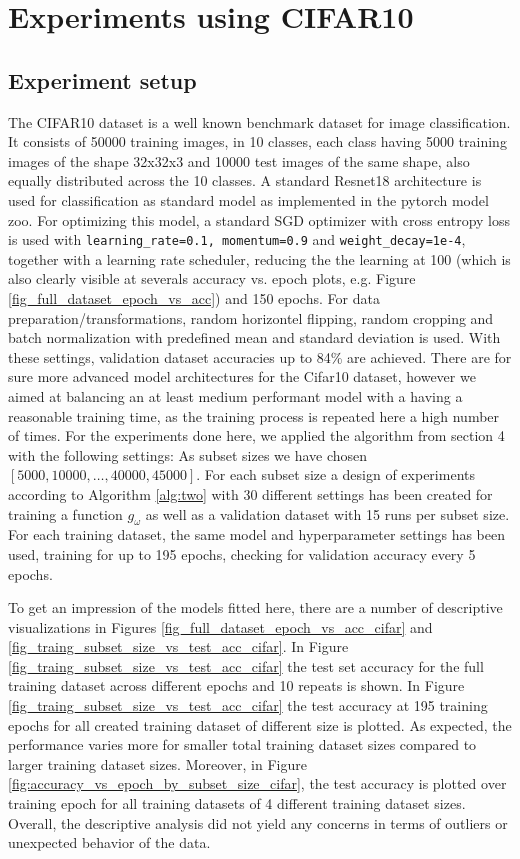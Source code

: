 \documentclass{article} %
\begin{document}
\section{Experiments using CIFAR10}

\subsection{Experiment setup}


The CIFAR10 dataset \cite{Cifar10} is a well known benchmark dataset for image classification.
It consists of 50000 training images, in 10 classes, each class having 5000 training images of the shape 32x32x3 and 10000 test images of the same shape, also equally distributed across the 10 classes.
A standard Resnet18 architecture \cite{he2015resnet} is used for classification as standard model as implemented in the pytorch \cite{pytorch} model zoo.
For optimizing this model, a standard SGD optimizer with cross entropy loss is used with \verb|learning_rate=0.1, momentum=0.9| and \verb|weight_decay=1e-4|, together with a learning rate scheduler, reducing the the learning at 100 (which is also clearly visible at severals accuracy vs. epoch plots, e.g. Figure \ref{fig_full_dataset_epoch_vs_acc}) and 150 epochs.
For data preparation/transformations, random horizontel flipping, random cropping and batch normalization with predefined mean and standard deviation is used.
With these settings, validation dataset accuracies up to 84\% are achieved.
There are for sure more advanced model architectures for the Cifar10 dataset, however we aimed at balancing an at least medium performant model with a having a reasonable training time, as the training process is repeated here a high number of times.
For the experiments done here, we applied the algorithm from section 4 with the following settings:
As subset sizes we have chosen $[5000, 10000, \dots, 40000, 45000]$. For each subset size a design of experiments according to Algorithm \ref{alg:two} with 30 different settings has been created for training a function $g_{\omega}$ as well as a validation dataset with 15 runs per subset size.
For each training dataset, the same model and hyperparameter settings has been used, training for up to 195 epochs, checking for validation accuracy every 5 epochs.


To get an impression of the models fitted here, there are a number of descriptive visualizations in Figures \ref{fig_full_dataset_epoch_vs_acc_cifar} and \ref{fig_traing_subset_size_vs_test_acc_cifar}. In Figure \ref{fig_traing_subset_size_vs_test_acc_cifar} the test set accuracy for the full training dataset across different epochs and 10 repeats is shown.
In Figure \ref{fig_traing_subset_size_vs_test_acc_cifar} the test accuracy at 195 training epochs for all created training dataset of different size is plotted. As expected, the performance varies more for smaller total training dataset sizes compared to larger training dataset sizes.
Moreover, in Figure \ref{fig:accuracy_vs_epoch_by_subset_size_cifar}, the test accuracy is plotted over training epoch for all training datasets of 4 different training dataset sizes.
Overall, the descriptive analysis did not yield any concerns in terms of outliers or unexpected behavior of the data.
\end{document}
